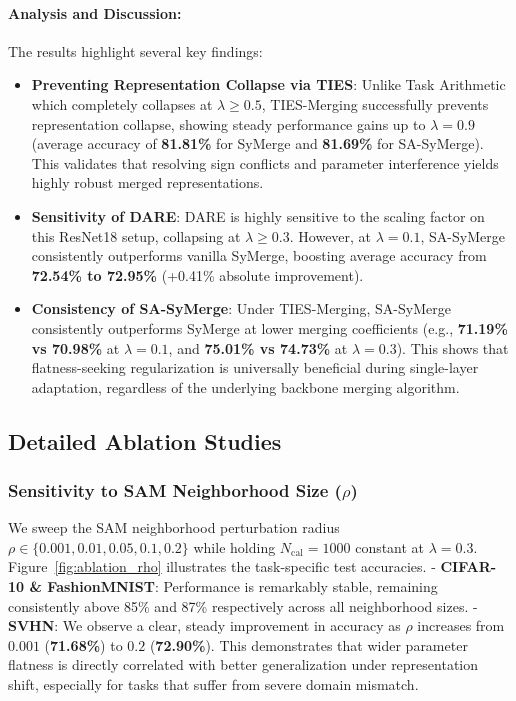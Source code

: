 \documentclass{article}
\theoremstyle{plain}
\theoremstyle{definition}
\theoremstyle{remark}
\begin{document}
\paragraph{Analysis and Discussion:}
The results highlight several key findings:
\begin{itemize}
    \item \textbf{Preventing Representation Collapse via TIES}: Unlike Task Arithmetic which completely collapses at $\lambda \ge 0.5$, TIES-Merging successfully prevents representation collapse, showing steady performance gains up to $\lambda = 0.9$ (average accuracy of \textbf{81.81\%} for SyMerge and \textbf{81.69\%} for SA-SyMerge). This validates that resolving sign conflicts and parameter interference yields highly robust merged representations.
    \item \textbf{Sensitivity of DARE}: DARE is highly sensitive to the scaling factor on this ResNet18 setup, collapsing at $\lambda \ge 0.3$. However, at $\lambda = 0.1$, SA-SyMerge consistently outperforms vanilla SyMerge, boosting average accuracy from \textbf{72.54\% to 72.95\%} (+0.41\% absolute improvement).
    \item \textbf{Consistency of SA-SyMerge}: Under TIES-Merging, SA-SyMerge consistently outperforms SyMerge at lower merging coefficients (e.g., \textbf{71.19\% vs 70.98\%} at $\lambda = 0.1$, and \textbf{75.01\% vs 74.73\%} at $\lambda = 0.3$). This shows that flatness-seeking regularization is universally beneficial during single-layer adaptation, regardless of the underlying backbone merging algorithm.
\end{itemize}

\subsection{Detailed Ablation Studies}

\subsubsection{Sensitivity to SAM Neighborhood Size ($\rho$)}
We sweep the SAM neighborhood perturbation radius $\rho \in \{0.001, 0.01, 0.05, 0.1, 0.2\}$ while holding $N_{\text{cal}} = 1000$ constant at $\lambda=0.3$. Figure~\ref{fig:ablation_rho} illustrates the task-specific test accuracies.
- \textbf{CIFAR-10 \& FashionMNIST}: Performance is remarkably stable, remaining consistently above 85\% and 87\% respectively across all neighborhood sizes.
- \textbf{SVHN}: We observe a clear, steady improvement in accuracy as $\rho$ increases from $0.001$ (\textbf{71.68\%}) to $0.2$ (\textbf{72.90\%}). This demonstrates that wider parameter flatness is directly correlated with better generalization under representation shift, especially for tasks that suffer from severe domain mismatch.
\end{document}
